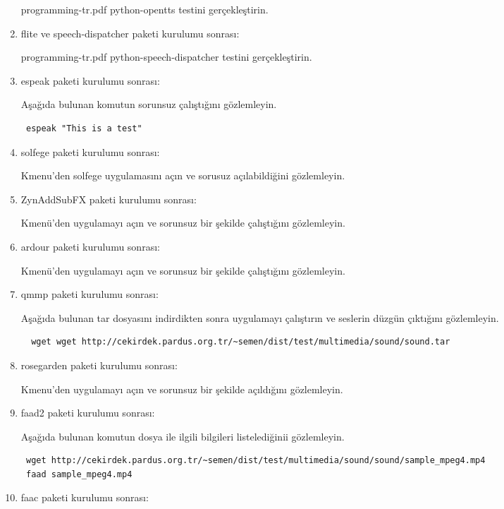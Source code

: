 \documentclass[a4paper,10pt]{article}
\begin{document}
\begin{enumerate}
programming-tr.pdf python-opentts testini gerçekleştirin.


\item flite ve speech-dispatcher paketi kurulumu sonrası:

programming-tr.pdf python-speech-dispatcher testini gerçekleştirin.

\item espeak paketi kurulumu sonrası:

Aşağıda bulunan komutun sorunsuz çalıştığını gözlemleyin.

\begin{verbatim}
 espeak "This is a test"
\end{verbatim}

\item solfege paketi kurulumu sonrası:

Kmenu'den solfege uygulamasını açın ve sorusuz açılabildiğini gözlemleyin.

\item ZynAddSubFX paketi kurulumu sonrası:

Kmenü'den uygulamayı açın ve sorunsuz bir şekilde çalıştığını gözlemleyin.

\item ardour paketi kurulumu sonrası:

Kmenü'den uygulamayı açın ve sorunsuz bir şekilde çalıştığını gözlemleyin.

\item qmmp paketi kurulumu sonrası:
 
Aşağıda bulunan tar dosyasını indirdikten sonra uygulamayı çalıştırın ve seslerin düzgün çıktığını gözlemleyin.
 \begin{verbatim}
  wget wget http://cekirdek.pardus.org.tr/~semen/dist/test/multimedia/sound/sound.tar
 \end{verbatim}	
\item rosegarden paketi kurulumu sonrası:

Kmenu'den uygulamayı açın ve sorunsuz bir şekilde açıldığını gözlemleyin.

\item faad2 paketi kurulumu sonrası:

Aşağıda bulunan komutun dosya ile ilgili bilgileri listelediğinii gözlemleyin. 
\begin{verbatim}
 wget http://cekirdek.pardus.org.tr/~semen/dist/test/multimedia/sound/sound/sample_mpeg4.mp4
 faad sample_mpeg4.mp4
\end{verbatim}

\item faac paketi kurulumu sonrası:


\end{enumerate}
\end{document}
